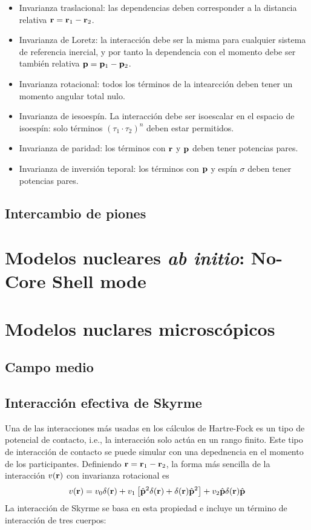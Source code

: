 \begin{itemize}
    \item Invarianza traslacional: las dependencias deben corresponder a la distancia relativa $\mathbf{r}=\mathbf{r}_1-\mathbf{r}_2$.
    \item Invarianza de Loretz: la interacción debe ser la misma para cualquier sistema de referencia inercial, y por tanto la dependencia con el momento debe ser también relativa $\mathbf{p}=\mathbf{p}_1-\mathbf{p}_2$.
    \item Invarianza rotacional: todos los términos de la intearcción deben tener un momento angular total nulo.
    \item Invarianza de iesoespín. La interacción debe ser isoescalar en el espacio de isoespín: solo términos $(\tau_1\cdot\tau_2)^n$ deben estar permitidos. 
    \item Invarianza de paridad: los términos con $\mathbf{r}$ y $\mathbf{p}$ deben tener potencias pares. 
    \item Invarianza de inversión teporal: los términos con $\mathbf{p}$ y espín $\sigma$ deben tener potencias pares. 
\end{itemize}



\subsection{Intercambio de piones}

\section{Modelos nucleares \textit{ab initio}: No-Core Shell mode}


\section{Modelos nuclares microscópicos}

\subsection{Campo medio}

\subsection{Interacción efectiva de Skyrme}

Una de las interacciones más usadas en los cálculos de Hartre-Fock es un tipo de potencial de contacto, i.e., la interacción solo actúa en un rango finito. Este tipo de interacción de contacto se puede simular con una depednencia en el momento de los participantes. Definiendo $\mathbf{r}=\mathbf{r}_1-\mathbf{r}_2$, la forma más sencilla de la interacción $v(\mathbf{r})$ con invarianza rotacional es
\begin{equation}
    v(\mathbf{r}) = v_0 \delta (\mathbf{r}) + v_1 \left[ \hat{\mathbf{p}}^2 \delta (\mathbf{r}) + \delta (\mathbf{r}) \hat{\mathbf{p}}^2  \right] + v_2 \hat{\mathbf{p}} \delta (\mathbf{r}) \hat{\mathbf{p}}
\end{equation}
La interacción de Skyrme se basa en esta propiedad e incluye un término de interacción de tres cuerpos:

